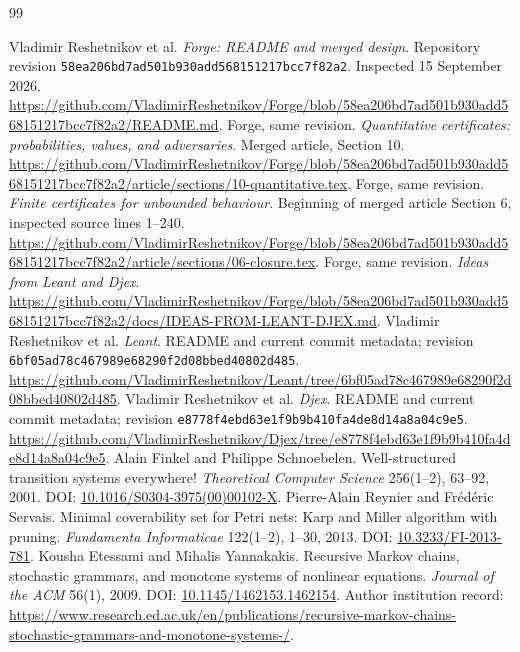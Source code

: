 \documentclass[11pt,a4paper]{article}
\theoremstyle{definition}\newtheorem{definition}[theorem]{Definition}
\theoremstyle{remark}\newtheorem{remark}[theorem]{Remark}
\newcommand{\code}[1]{\nolinkurl{#1}}
\begin{document}
\begingroup
\small
\begin{thebibliography}{99}
 Vladimir Reshetnikov et al. \emph{Forge: README and merged design}. Repository revision \code{58ea206bd7ad501b930add568151217bcc7f82a2}. Inspected 15 September 2026. \url{https://github.com/VladimirReshetnikov/Forge/blob/58ea206bd7ad501b930add568151217bcc7f82a2/README.md}.
 Forge, same revision. \emph{Quantitative certificates: probabilities, values, and adversaries}. Merged article, Section 10. \url{https://github.com/VladimirReshetnikov/Forge/blob/58ea206bd7ad501b930add568151217bcc7f82a2/article/sections/10-quantitative.tex}.
 Forge, same revision. \emph{Finite certificates for unbounded behaviour}. Beginning of merged article Section 6, inspected source lines 1--240. \url{https://github.com/VladimirReshetnikov/Forge/blob/58ea206bd7ad501b930add568151217bcc7f82a2/article/sections/06-closure.tex}.
 Forge, same revision. \emph{Ideas from Leant and Djex}. \url{https://github.com/VladimirReshetnikov/Forge/blob/58ea206bd7ad501b930add568151217bcc7f82a2/docs/IDEAS-FROM-LEANT-DJEX.md}.
 Vladimir Reshetnikov et al. \emph{Leant}. README and current commit metadata; revision \code{6bf05ad78c467989e68290f2d08bbed40802d485}. \url{https://github.com/VladimirReshetnikov/Leant/tree/6bf05ad78c467989e68290f2d08bbed40802d485}.
 Vladimir Reshetnikov et al. \emph{Djex}. README and current commit metadata; revision \code{e8778f4ebd63e1f9b9b410fa4de8d14a8a04c9e5}. \url{https://github.com/VladimirReshetnikov/Djex/tree/e8778f4ebd63e1f9b9b410fa4de8d14a8a04c9e5}.
 Alain Finkel and Philippe Schnoebelen. Well-structured transition systems everywhere! \emph{Theoretical Computer Science} 256(1--2), 63--92, 2001. DOI: \href{https://doi.org/10.1016/S0304-3975(00)00102-X}{10.1016/S0304-3975(00)00102-X}.
 Pierre-Alain Reynier and Fr\'ed\'eric Servais. Minimal coverability set for Petri nets: Karp and Miller algorithm with pruning. \emph{Fundamenta Informaticae} 122(1--2), 1--30, 2013. DOI: \href{https://doi.org/10.3233/FI-2013-781}{10.3233/FI-2013-781}.
 Kousha Etessami and Mihalis Yannakakis. Recursive Markov chains, stochastic grammars, and monotone systems of nonlinear equations. \emph{Journal of the ACM} 56(1), 2009. DOI: \href{https://doi.org/10.1145/1462153.1462154}{10.1145/1462153.1462154}. Author institution record: \url{https://www.research.ed.ac.uk/en/publications/recursive-markov-chains-stochastic-grammars-and-monotone-systems-/}.

\end{thebibliography}
\end{document}
